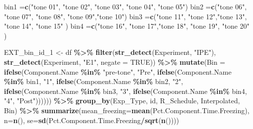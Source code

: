 \documentclass[
]{article}
\newenvironment{Shaded}{\begin{snugshade}}{\end{snugshade}}
\newcommand{\AttributeTok}[1]{\textcolor[rgb]{0.13,0.29,0.53}{#1}}
\newcommand{\ConstantTok}[1]{\textcolor[rgb]{0.56,0.35,0.01}{#1}}
\newcommand{\FunctionTok}[1]{\textcolor[rgb]{0.13,0.29,0.53}{\textbf{#1}}}
\newcommand{\NormalTok}[1]{#1}
\newcommand{\OtherTok}[1]{\textcolor[rgb]{0.56,0.35,0.01}{#1}}
\newcommand{\SpecialCharTok}[1]{\textcolor[rgb]{0.81,0.36,0.00}{\textbf{#1}}}
\newcommand{\StringTok}[1]{\textcolor[rgb]{0.31,0.60,0.02}{#1}}
\begin{document}
\begin{Shaded}
\begin{Highlighting}[]
\NormalTok{bin1 }\OtherTok{=}\FunctionTok{c}\NormalTok{(}\StringTok{"tone 01"}\NormalTok{, }\StringTok{"tone 02"}\NormalTok{, }\StringTok{"tone 03"}\NormalTok{, }\StringTok{"tone 04"}\NormalTok{, }\StringTok{"tone 05"}\NormalTok{)}
\NormalTok{bin2 }\OtherTok{=}\FunctionTok{c}\NormalTok{(}\StringTok{"tone 06"}\NormalTok{, }\StringTok{"tone 07"}\NormalTok{, }\StringTok{"tone 08"}\NormalTok{, }\StringTok{"tone 09"}\NormalTok{,}\StringTok{"tone 10"}\NormalTok{)}
\NormalTok{bin3 }\OtherTok{=}\FunctionTok{c}\NormalTok{(}\StringTok{"tone 11"}\NormalTok{, }\StringTok{"tone 12"}\NormalTok{,}\StringTok{"tone 13"}\NormalTok{, }\StringTok{"tone 14"}\NormalTok{, }\StringTok{"tone 15"}\NormalTok{ )}
\NormalTok{bin4 }\OtherTok{=}\FunctionTok{c}\NormalTok{(}\StringTok{"tone 16"}\NormalTok{, }\StringTok{"tone 17"}\NormalTok{,}\StringTok{"tone 18"}\NormalTok{, }\StringTok{"tone 19"}\NormalTok{, }\StringTok{"tone 20"}\NormalTok{ )}

\NormalTok{EXT\_bin\_id\_1 }\OtherTok{\textless{}{-}}\NormalTok{ df }\SpecialCharTok{\%\textgreater{}\%} 
  \FunctionTok{filter}\NormalTok{(}\FunctionTok{str\_detect}\NormalTok{(Experiment, }\StringTok{"IPE"}\NormalTok{),}
         \FunctionTok{str\_detect}\NormalTok{(Experiment, }\StringTok{"E1"}\NormalTok{, }\AttributeTok{negate =} \ConstantTok{TRUE}\NormalTok{)) }\SpecialCharTok{\%\textgreater{}\%} 
  \FunctionTok{mutate}\NormalTok{(}\AttributeTok{Bin =} \FunctionTok{ifelse}\NormalTok{(Component.Name }\SpecialCharTok{\%in\%} \StringTok{"pre{-}tone"}\NormalTok{, }\StringTok{"Pre"}\NormalTok{,}
                      \FunctionTok{ifelse}\NormalTok{(Component.Name }\SpecialCharTok{\%in\%}\NormalTok{ bin1, }\StringTok{"1"}\NormalTok{,}
                             \FunctionTok{ifelse}\NormalTok{(Component.Name }\SpecialCharTok{\%in\%}\NormalTok{ bin2, }\StringTok{"2"}\NormalTok{,}
                                    \FunctionTok{ifelse}\NormalTok{(Component.Name }\SpecialCharTok{\%in\%}\NormalTok{ bin3, }\StringTok{"3"}\NormalTok{,}
                                           \FunctionTok{ifelse}\NormalTok{(Component.Name }\SpecialCharTok{\%in\%}\NormalTok{ bin4, }\StringTok{"4"}\NormalTok{, }\StringTok{"Post"}\NormalTok{)))))) }\SpecialCharTok{\%\textgreater{}\%} 
  \FunctionTok{group\_by}\NormalTok{(Exp\_Type, id, R\_Schedule, Interpolated, Bin) }\SpecialCharTok{\%\textgreater{}\%} 
  \FunctionTok{summarize}\NormalTok{(}\AttributeTok{mean\_freezing=}\FunctionTok{mean}\NormalTok{(Pct.Component.Time.Freezing), }\AttributeTok{n=}\FunctionTok{n}\NormalTok{(),}
            \AttributeTok{se=}\FunctionTok{sd}\NormalTok{(Pct.Component.Time.Freezing}\SpecialCharTok{/}\FunctionTok{sqrt}\NormalTok{(}\FunctionTok{n}\NormalTok{())))}
\end{Highlighting}
\end{Shaded}
\end{document}

